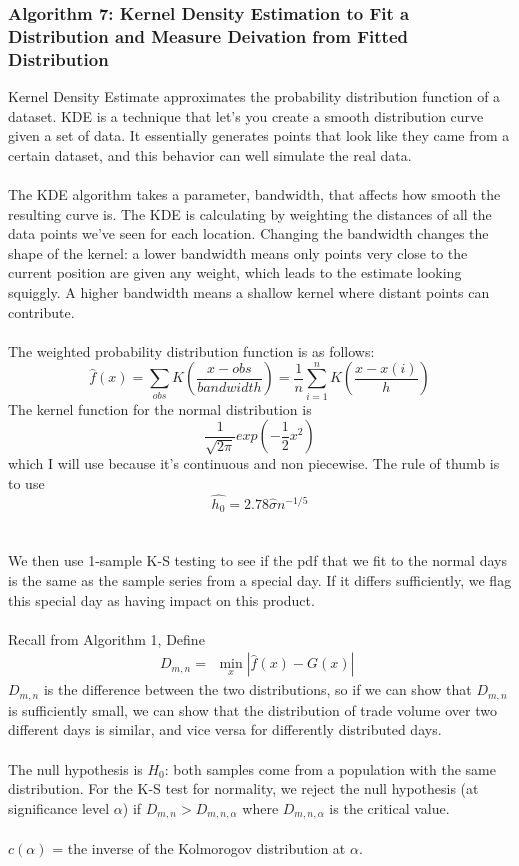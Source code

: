 \documentclass[11pt]{article}
\begin{document}
\subsubsection*{Algorithm 7: Kernel Density Estimation to Fit a Distribution and Measure Deivation from Fitted Distribution}
Kernel Density Estimate approximates the probability distribution function of a dataset. KDE is a technique that let's you create a smooth distribution curve given a set of data. It essentially generates points that look like they came from a certain dataset, and this behavior can well simulate the real data.
\\\\The KDE algorithm takes a parameter, bandwidth, that affects how smooth the resulting curve is. The KDE is calculating by weighting the distances of all the data points we've seen for each location. Changing the bandwidth changes the shape of the kernel: a lower bandwidth means only points very close to the current position are given any weight, which leads to the estimate looking squiggly. A higher bandwidth means a shallow kernel where distant points can contribute.
\\\\The weighted probability distribution function is as follows:
$$\hat{f}(x) = \sum_{obs}K(\frac{x-obs}{bandwidth}) = \frac{1}{n} \sum_{i=1}^nK(\frac{x-x(i)}{h})$$
The kernel function for the normal distribution is $$\frac{1}{\sqrt{2\pi}} exp (-\frac{1}{2}x^2)$$ which I will use because it's continuous and non piecewise.
The rule of thumb is to use $$\hat{h_0} = 2.78 \hat{\sigma} n^{-1/5}$$
\\\\We then use 1-sample K-S testing to see if the pdf that we fit to the normal days is the same as the sample series from a special day. If it differs sufficiently, we flag this special day as having impact on this product.
\\\\Recall from Algorithm 1, Define
\begin{equation}D_{m,n} = 
\begin{aligned}
\min_{x} |\hat{f}(x)  - G(x)|
\end{aligned}
\end{equation}
$D_{m,n}$ is the difference between the two distributions, so if we can show that $D_{m,n}$ is sufficiently small, we can show that the distribution of trade volume over two different days is similar, and vice versa for differently distributed days. 
\\\\The null hypothesis is $H_0$: both samples come from a population with the same distribution. For the K-S test for normality, we reject the null hypothesis (at significance level $\alpha$) if $D_{m,n} > D_{m,n,\alpha}$ where $D_{m,n,\alpha}$ is the critical value. 
\\\\$c(\alpha)$ = the inverse of the Kolmorogov distribution at $\alpha$.
\end{document}
